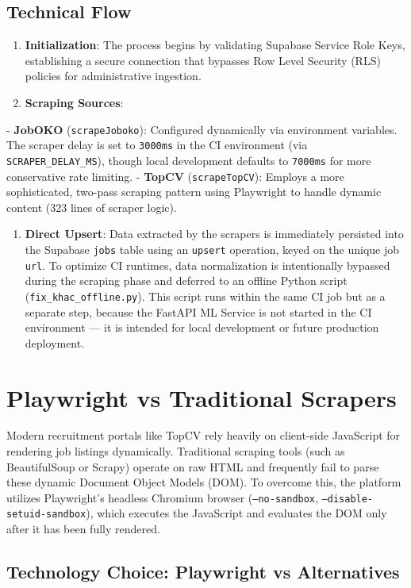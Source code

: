 \subsection{Technical Flow}
\begin{enumerate}
\item \textbf{Initialization}: The process begins by validating Supabase Service Role Keys, establishing a secure connection that bypasses Row Level Security (RLS) policies for administrative ingestion.
\item \textbf{Scraping Sources}:
\end{enumerate}
   - \textbf{JobOKO} (\texttt{scrapeJoboko}): Configured dynamically via environment variables. The scraper delay is set to \texttt{3000ms} in the CI environment (via \texttt{SCRAPER\_DELAY\_MS}), though local development defaults to \texttt{7000ms} for more conservative rate limiting.
   - \textbf{TopCV} (\texttt{scrapeTopCV}): Employs a more sophisticated, two-pass scraping pattern using Playwright to handle dynamic content (323 lines of scraper logic).
\begin{enumerate}
\item \textbf{Direct Upsert}: Data extracted by the scrapers is immediately persisted into the Supabase \texttt{jobs} table using an \texttt{upsert} operation, keyed on the unique job \texttt{url}. To optimize CI runtimes, data normalization is intentionally bypassed during the scraping phase and deferred to an offline Python script (\texttt{fix\_khac\_offline.py}). This script runs within the same CI job but as a separate step, because the FastAPI ML Service is not started in the CI environment — it is intended for local development or future production deployment.
\end{enumerate}

\section{Playwright vs Traditional Scrapers}
Modern recruitment portals like TopCV rely heavily on client-side JavaScript for rendering job listings dynamically. Traditional scraping tools (such as BeautifulSoup or Scrapy) operate on raw HTML and frequently fail to parse these dynamic Document Object Models (DOM). To overcome this, the platform utilizes Playwright's headless Chromium browser (\texttt{--no-sandbox}, \texttt{--disable-setuid-sandbox}), which executes the JavaScript and evaluates the DOM only after it has been fully rendered.

\subsection{Technology Choice: Playwright vs Alternatives}

